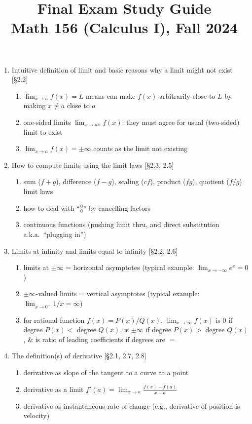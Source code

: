 \documentclass[11pt]{article}
\title{Final Exam Study Guide \\ Math 156 (Calculus I), Fall 2024}
\date{}
\begin{document}
\maketitle

\pagestyle{empty}
\thispagestyle{empty}

\vspace{-2.5cm}

\begin{enumerate}
\item Intuitive definition of limit and basic reasons why a limit might not exist [\S2.2]
\begin{enumerate}
\item $\lim_{x\to a} f(x) = L$ means can make $f(x)$ arbitrarily close to $L$ by making $x \neq a$ close to $a$
\item one-sided limits $\lim_{x\to a^{\pm}} f(x)$: they must agree for usual (two-sided) limit to exist
\item $\lim_{x\to a} f(x) = \pm \infty$ counts as the limit not existing
\end{enumerate}

\item How to compute limits using the limit laws [\S2.3, 2.5]
\begin{enumerate}
\item sum ($f+g$), difference ($f-g$), scaling ($cf$), product ($fg$), quotient ($f/g$) limit laws
\item how to deal with ``$\frac{0}{0}$'' by cancelling factors
\item continuous functions (pushing limit thru, and direct substitution a.k.a.~``plugging in'')
\end{enumerate}

\item Limits at infinity and limits equal to infinity [\S2.2, 2.6]
\begin{enumerate}
\item limits at $\pm \infty$ = horizontal asymptotes (typical example: $\lim_{x\to -\infty} e^x = 0$)
\item $\pm \infty$-valued limits = vertical asymptotes (typical example: $\lim_{x\to 0^+} 1/x=\infty$)
\item for rational function $f(x) = P(x)/Q(x)$, $\lim_{x\to \infty} f(x)$ is $0$ if degree $P(x) <$ degree $Q(x)$, is $\pm\infty$ if degree $P(x) >$ degree $Q(x)$, $\&$ is ratio of leading coefficients if degrees are $=$
\end{enumerate}

\item The definition(s) of derivative [\S2.1, 2.7, 2.8]
\begin{enumerate}
\item derivative as slope of the tangent to a curve at a point
\item derivative as a limit $f'(a) = \lim_{x \to a} \frac{f(x)-f(a)}{x-a}$
\item derivative as instantaneous rate of change (e.g., derivative of position is velocity)
\end{enumerate}


\end{enumerate}
\end{document}
